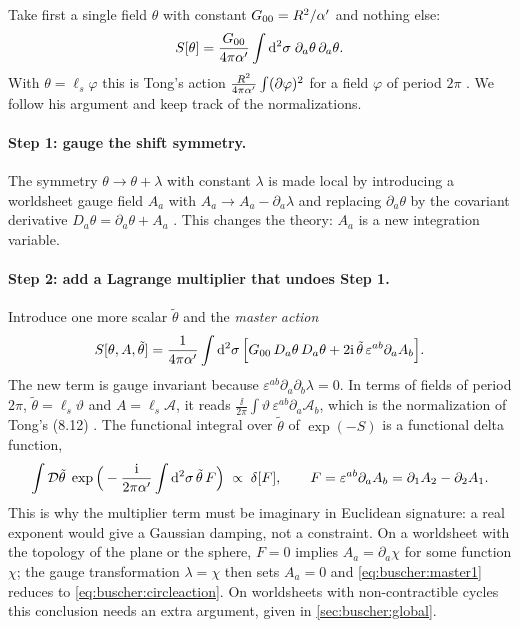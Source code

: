 Take first a single field $\theta$ with constant $G_{00}=R^2/\alpha'$ and nothing else:
\begin{equation}\label{eq:buscher:circleaction}
 S[\theta]=\frac{G_{00}}{4\pi\alpha'}\int\mathrm{d}^2\sigma\;\partial_a\theta\,\partial_a\theta .
\end{equation}
With $\theta=\ell_s\varphi$ this is Tong's action $\frac{R^2}{4\pi\alpha'}\int(\partial\varphi)^2$
for a field $\varphi$ of period $2\pi$ . We follow his
argument and keep track of the normalizations.

\paragraph{Step 1: gauge the shift symmetry.} The symmetry $\theta\to\theta+\lambda$ with
constant $\lambda$ is made local by introducing a worldsheet gauge field $A_a$ with
$A_a\to A_a-\partial_a\lambda$ and replacing $\partial_a\theta$ by the covariant derivative
$D_a\theta=\partial_a\theta+A_a$ . This changes the
theory: $A_a$ is a new integration variable.

\paragraph{Step 2: add a Lagrange multiplier that undoes Step 1.} Introduce one more scalar
$\tilde\theta$ and the \emph{master action}
\begin{equation}\label{eq:buscher:master1}
 S[\theta,A,\tilde\theta]=\frac{1}{4\pi\alpha'}\int\mathrm{d}^2\sigma\,
   \Big[G_{00}\,D_a\theta\,D_a\theta+2\mathrm{i}\,\tilde\theta\,\varepsilon^{ab}\partial_aA_b\Big].
\end{equation}
The new term is gauge invariant because
$\varepsilon^{ab}\partial_a\partial_b\lambda=0$. In terms of fields of period $2\pi$,
$\tilde\theta=\ell_s\vartheta$ and $A=\ell_s\mathcal A$, it reads
$\frac{\ii}{2\pi}\int\vartheta\,\varepsilon^{ab}\partial_a\mathcal A_b$, which is the
normalization of Tong's (8.12) . The functional integral
over $\tilde\theta$ of $\exp(-S)$ is a functional delta function,
\[
 \int\mathcal D\tilde\theta\;
 \exp\Big(-\frac{\mathrm{i}}{2\pi\alpha'}\int\mathrm{d}^2\sigma\,\tilde\theta\,F\Big)\;\propto\;\delta[F],
 \qquad F=\varepsilon^{ab}\partial_aA_b=\partial_1A_2-\partial_2A_1 .
\]
This is why the multiplier term must be imaginary in Euclidean signature: a real exponent would
give a Gaussian damping, not a constraint. On a worldsheet with the topology of the plane or
the sphere, $F=0$ implies $A_a=\partial_a\chi$ for some function $\chi$; the gauge
transformation $\lambda=\chi$ then sets $A_a=0$ and \eqref{eq:buscher:master1} reduces to
\eqref{eq:buscher:circleaction}. On worldsheets with non-contractible cycles this conclusion
needs an extra argument, given in \cref{sec:buscher:global}.

